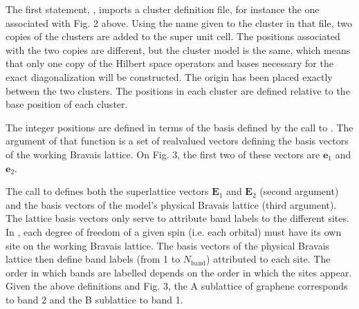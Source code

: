 \documentclass[letterpaper,10pt,english]{sphinxmanual}
\begin{document}
\begin{sphinxVerbatim}[commandchars=\\\{\}]
 \PYG{p}{[}\PYG{p}{]}   
 \PYG{p}{[}\PYG{p}{]}   
 \PYG{p}{[}\PYG{p}{]}   
\end{sphinxVerbatim}

\sphinxAtStartPar
The first statement, , imports a cluster definition file, for instance the one associated with Fig. 2 above. Using the name  given to the cluster in that file, two copies of the clusters are added to the super unit cell. The positions associated with the two copies are different, but the cluster model is the same, which means that only one copy of the Hilbert space operators and bases necessary for the exact diagonalization will be constructed. The origin has been placed exactly between the two clusters. The positions in each cluster are defined relative to the base position of each cluster.

\sphinxAtStartPar
The integer positions are defined in terms of the basis defined by the call to . The argument of that function is a set of real\sphinxhyphen{}valued vectors defining the basis vectors of the working Bravais lattice.
On Fig. 3, the first two of these vectors are \(\mathbf{e}_1\) and \(\mathbf{e}_2\).

\sphinxAtStartPar
The call to  defines both the superlattice vectors \(\mathbf{E}_1\) and \(\mathbf{E}_2\) (second argument) and the basis vectors of the model’s physical Bravais lattice (third argument).
The lattice basis vectors only serve to attribute band labels to the different sites. In , each degree of freedom of a given spin (i.e. each orbital) must have its own site on the working Bravais lattice. The basis vectors of the physical Bravais lattice then define band labels (from 1 to \(N_\mathrm{band}\)) attributed to each site. The order in which bands are labelled depends on the order in which the sites appear. Given the above definitions and Fig. 3, the A sublattice of graphene corresponds to band 2 and the B sublattice to band 1.
\end{document}
